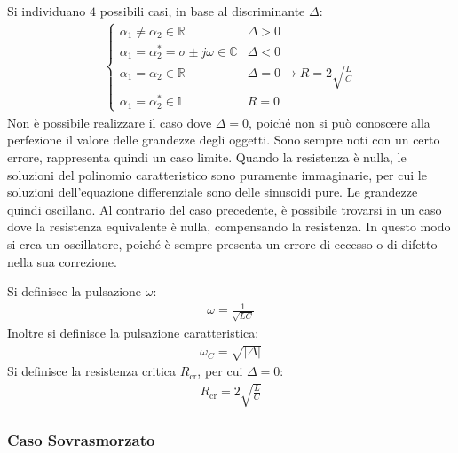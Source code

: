 \documentclass{article}
\numberwithin{equation}{subsection}
\begin{document}
Si individuano $4$ possibili casi, in base al discriminante $\Delta$:
\begin{gather*}
    \begin{cases}
        \alpha_1\neq\alpha_2\in\mathbb{R}^-&\Delta>0\\
        \alpha_1=\alpha_2^*=\sigma\pm j\omega\in\mathbb{C}&\Delta<0\\
        \alpha_1=\alpha_2\in\mathbb{R}&\Delta=0\to R=2\displaystyle\sqrt{\frac{L}{C}}\\
        \alpha_1=\alpha_2^*\in\mathbb{I}&R=0
    \end{cases}
\end{gather*}
Non è possibile realizzare il caso dove $\Delta=0$, poiché non si può conoscere alla perfezione il valore delle grandezze degli oggetti. Sono sempre noti con un certo 
errore, rappresenta quindi un caso limite. 
Quando la resistenza è nulla, le soluzioni del polinomio caratteristico sono puramente immaginarie, per cui le soluzioni dell'equazione differenziale sono delle sinusoidi pure. 
Le grandezze quindi oscillano. 
Al contrario 
del caso precedente, è possibile trovarsi in un caso dove la resistenza equivalente è nulla, compensando la resistenza. In questo modo si crea un oscillatore, poiché è 
sempre presenta un errore di eccesso o di difetto nella sua correzione. 

Si definisce la pulsazione $\omega$:
\begin{gather*}
    \omega=\displaystyle\frac{1}{\sqrt{LC}}
\end{gather*}
Inoltre si definisce la pulsazione caratteristica:
\begin{gather*}
    \omega_C=\sqrt{|\Delta|}
\end{gather*}
Si definisce la resistenza critica $R_{\mathrm{cr}}$, per cui $\Delta=0$:
\begin{gather*}
    R_{\mathrm{cr}}=2\displaystyle\sqrt{\frac{L}{C}}
\end{gather*}

\subsubsection{Caso Sovrasmorzato}
\end{document}

